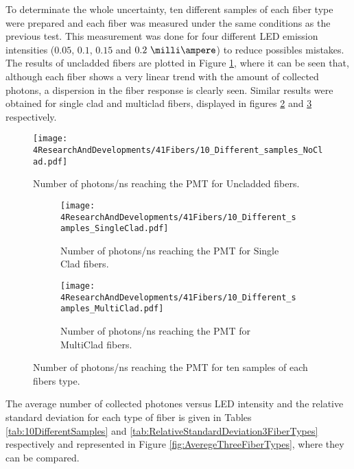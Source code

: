 To determinate the whole uncertainty, ten different samples of each fiber type were prepared and each fiber was measured under the same conditions as the previous test. This measurement was done for four different LED emission intensities ($0.05$, $0.1$, $0.15$ and $0.2~\milli\ampere$) to reduce possibles mistakes. The results of uncladded fibers are plotted in Figure \ref{fig:10samplesNC}, where it can be seen that, although each fiber shows a very linear trend with the amount of collected photons, a dispersion in the fiber response is clearly seen. Similar results were obtained for single clad and multiclad fibers, displayed in figures \ref{subfig:10samplesSC} and \ref{subfig:10samplesMC} respectively.

\begin{figure}[h]
\centering
\texttt{[image: 4ResearchAndDevelopments/41Fibers/10\_Different\_samples\_NoClad.pdf]}
\caption{Number of photons/ns reaching the PMT for Uncladded fibers.\label{fig:10samplesNC}}
\end{figure}

\begin{figure}
\centering
    \begin{subfigure}[b]{1\textwidth}
    \centering
    \texttt{[image: 4ResearchAndDevelopments/41Fibers/10\_Different\_samples\_SingleClad.pdf]}  
    \caption{Number of photons/ns reaching the PMT for Single Clad fibers.\label{subfig:10samplesSC}}
    \end{subfigure}
    \hfill
    \begin{subfigure}[b]{1\textwidth}
    \centering
    \texttt{[image: 4ResearchAndDevelopments/41Fibers/10\_Different\_samples\_MultiClad.pdf]}  
    \caption{Number of photons/ns reaching the PMT for MultiClad fibers.\label{subfig:10samplesMC}}
    \end{subfigure}
 \caption{Number of photons/ns reaching the PMT for ten samples of each fibers type.}
 \label{fig:10samplesThreeTypes}
\end{figure}

The average number of collected photones versus LED intensity and the relative standard deviation for each type of fiber is given in Tables \ref{tab:10DifferentSamples} and \ref{tab:RelativeStandardDeviation3FiberTypes} respectively and represented in Figure \ref{fig:AveregeThreeFiberTypes}, where they can be compared. 

